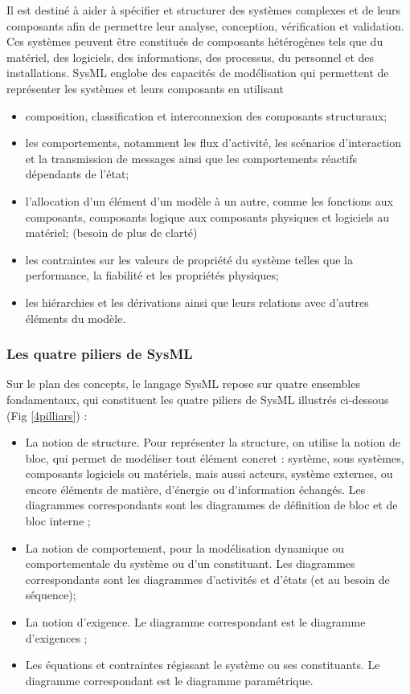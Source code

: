 \documentclass[french]{spimufcphdthesis}
\begin{document}
Il est destiné à aider à spécifier et structurer des systèmes complexes et de leurs composants afin de permettre leur analyse, conception, vérification et validation. Ces systèmes peuvent être constitués de composants hétérogènes tels que du matériel, des logiciels, des informations, des processus, du personnel et des installations.
SysML englobe des capacités de modélisation qui permettent de représenter les systèmes et leurs composants en utilisant
\begin{itemize}[label=\textbullet, font=\LARGE]
\item composition, classification et interconnexion des composants structuraux;
\item les comportements, notamment les flux d'activité, les scénarios d'interaction et la transmission de messages ainsi que les comportements réactifs dépendants de l'état;
\item l'allocation d'un élément d’un modèle à un autre, comme les fonctions aux composants, composants logique aux composants physiques et logiciels au matériel; (besoin de plus de clarté)
\item les contraintes sur les valeurs de propriété du système telles que la performance, la fiabilité et les propriétés physiques;
\item les hiérarchies et les dérivations ainsi que leurs relations avec d'autres éléments  du modèle.
\end{itemize}

\subsubsection{Les quatre piliers de SysML}

 Sur  le  plan  des  concepts,  le  langage  SysML  repose  sur  quatre  ensembles  fondamentaux,  qui constituent 
les quatre piliers de SysML illustrés ci-dessous (Fig \ref{4pilliars}) :

\begin{itemize}[label=\textbullet, font=\LARGE]
\item La  notion  de  structure.  Pour  représenter  la  structure,  on  utilise  la  notion  de  bloc,  qui 
permet  de  modéliser  tout  élément  concret  :  système,  sous  systèmes,  composants logiciels  ou  matériels,  mais  aussi  acteurs,  système  externes,  ou  encore  éléments  de 
matière, d’énergie ou d’information échangés.  Les diagrammes correspondants sont les diagrammes de définition de bloc et de bloc interne ;
\item La notion de comportement, pour la modélisation dynamique ou comportementale du système  ou  d’un  constituant.  Les  diagrammes  correspondants  sont  les  diagrammes d’activités et d’états (et au besoin de séquence);
\item La notion d’exigence. Le diagramme correspondant est le diagramme d’exigences ;
\item Les  équations  et  contraintes  régissant  le  système  ou  ses  constituants.  Le  diagramme correspondant est le diagramme paramétrique.


\end{itemize}
\end{document}
